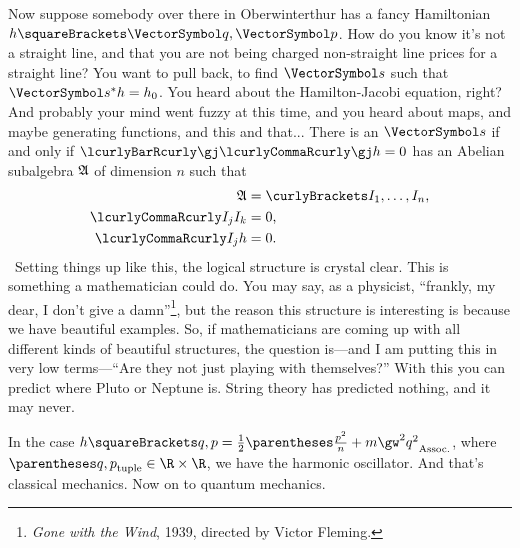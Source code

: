 \documentclass[10pt, a4paper, twoside]{lecturenotes}
\begin{document}
Now suppose somebody over there in Oberwinterthur has a fancy Hamiltonian $h\of{\vq,\vp}$. How do you know it's not a straight line, and that you are not being charged non-straight line prices for a straight line? You want to pull back, to find $\vs$ such that $\Pullback \vs h = h_0$. You heard about the Hamilton-Jacobi equation, right? And probably your mind went fuzzy at this time, and you heard about maps, and maybe generating functions, and this and that... 
There is an $\vs$ if and only if $\setst{\gj}{\Poisson\gj h = 0}$ has an Abelian subalgebra $\mathfrak{A}$ of dimension $n$ such that
\begin{align*}
\LieAlgebraSymbol A &= \set{I_1,\dotsc,I_n}\text, \\
\Poisson{I_j}{I_k}&= 0\text,\\
\Poisson{I_j}{h}&=0\text.
\end{align*}
\
Setting things up like this, the logical structure is crystal clear. This is something a mathematician could do. You may say, as a physicist, ``frankly, my dear, I don't give a damn''\footnote{\emph{Gone with the Wind}, 1939, directed by Victor Fleming.}, but the reason this structure is interesting is because we have beautiful examples. So, if mathematicians are coming up with all different kinds of beautiful structures, the question is---and I am putting this in very low terms---``Are they not just playing with themselves?'' With this you can predict where Pluto or Neptune is. String theory has predicted nothing, and it may never.

In the case $h\of{q,p}=\frac{1}{2}\pa{\frac{p^2}{n} + m\gw^2 q^2}$, where $\tuple{q,p}\in\R\Cartesian\R$, we have the harmonic oscillator.
And that's classical mechanics. Now on to quantum mechanics.
\end{document}
